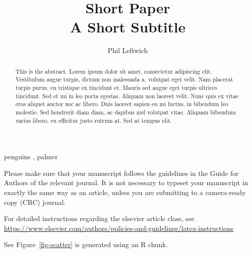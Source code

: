 \documentclass[
  authoryear,
  preprint]{elsarticle}
\begin{document}
\begin{frontmatter}
\title{Short Paper \\\large{A Short Subtitle} }
\author[1]{Phil Leftwich%
%
}


        
\begin{abstract}
This is the abstract. Lorem ipsum dolor sit amet, consectetur adipiscing
elit. Vestibulum augue turpis, dictum non malesuada a, volutpat eget
velit. Nam placerat turpis purus, eu tristique ex tincidunt et. Mauris
sed augue eget turpis ultrices tincidunt. Sed et mi in leo porta
egestas. Aliquam non laoreet velit. Nunc quis ex vitae eros aliquet
auctor nec ac libero. Duis laoreet sapien eu mi luctus, in bibendum leo
molestie. Sed hendrerit diam diam, ac dapibus nisl volutpat vitae.
Aliquam bibendum varius libero, eu efficitur justo rutrum at. Sed at
tempus elit.
\end{abstract}





\begin{keyword}
    penguins \sep 
    palmer
\end{keyword}
\end{frontmatter}
    

Please make sure that your manuscript follows the guidelines in the
Guide for Authors of the relevant journal. It is not necessary to
typeset your manuscript in exactly the same way as an article, unless
you are submitting to a camera-ready copy (CRC) journal.

For detailed instructions regarding the elsevier article class, see
\url{https://www.elsevier.com/authors/policies-and-guidelines/latex-instructions}

See Figure~\ref{fig-scatter} is generated using an R chunk.
\end{document}

